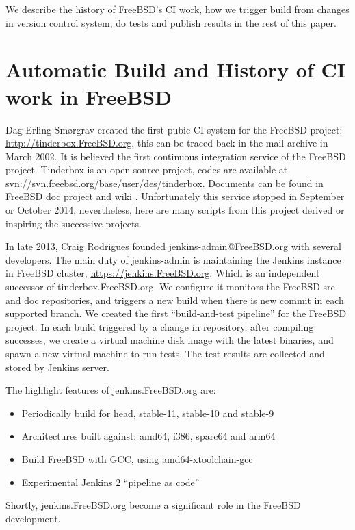 \documentclass[a4paper,twocolumn,10pt]{article}
\begin{document}
We describe the history of FreeBSD's CI work, how we trigger build from changes
in version control system, do tests and publish results in the rest of this
paper.

\section{Automatic Build and History of CI work in FreeBSD}

Dag-Erling Smørgrav created the first pubic CI system for the FreeBSD project:
\url{http://tinderbox.FreeBSD.org}, this can be traced back in the mail archive
in March 2002. It is believed the first continuous integration service of the
FreeBSD project. Tinderbox is an open source project, codes are available at
\url{svn://svn.freebsd.org/base/user/des/tinderbox}.  Documents can be found in
FreeBSD doc project \cite{tinerbox-doc} and wiki \cite{tinerbox-wiki}.
Unfortunately this service stopped in September or October 2014, nevertheless,
here are many scripts from this project derived or inspiring the successive
projects.

In late 2013, Craig Rodrigues founded jenkins-admin@FreeBSD.org with several
developers. The main duty of jenkins-admin is maintaining the Jenkins
instance in FreeBSD cluster, \url{https://jenkins.FreeBSD.org}. Which is an
independent successor of tinderbox.FreeBSD.org. We configure it monitors the
FreeBSD src and doc repositories, and triggers a new build when there is new
commit in each supported branch. We created the first ``build-and-test pipeline''
for the FreeBSD project. In each build triggered by a change in repository,
after compiling successes, we create a virtual machine disk image with the
latest binaries, and spawn a new virtual machine to run tests. The test results
are collected and stored by Jenkins server.

The highlight features of jenkins.FreeBSD.org are:

\begin{itemize}
\item Periodically build for head, stable-11, stable-10 and stable-9
\item Architectures built against: amd64, i386, sparc64 and arm64
\item Build FreeBSD with GCC, using amd64-xtoolchain-gcc
\item Experimental Jenkins 2 ``pipeline as code''
\end{itemize}

Shortly, jenkins.FreeBSD.org become a significant role in the FreeBSD
development.
\end{document}
